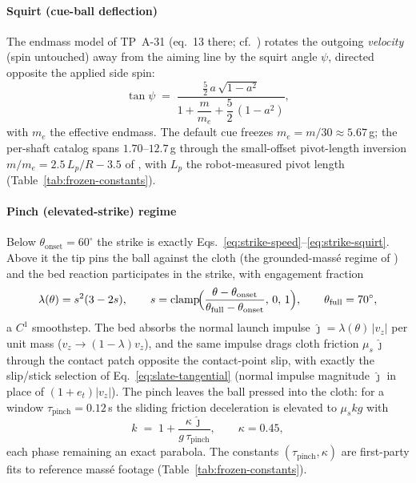 \paragraph{Squirt (cue-ball deflection)} The endmass model of TP~A-31
(eq.~13 there; cf.\ \citealp{shepard2001squirt,cross2008squirt})
rotates the outgoing \emph{velocity} (spin untouched) away from the
aiming line by the squirt angle $\psi$, directed opposite the applied
side spin:
\begin{equation}
\tan\psi \;=\; \frac{\tfrac{5}{2}\,a\,\sqrt{1-a^{2}}}
{1 + \dfrac{m}{m_e} + \dfrac{5}{2}\,(1-a^{2})},
\label{eq:strike-squirt}
\end{equation}
with $m_e$ the effective endmass. The default cue freezes
$m_e = m/30 \approx 5.67$\,g; the per-shaft catalog spans
$1.70$--$12.7$\,g through the small-offset pivot-length inversion
$m/m_e = 2.5\,L_p/R - 3.5$ of \citet{shepard2001squirt}, with
$L_p$ the robot-measured pivot length
(Table~\ref{tab:frozen-constants}).

\paragraph{Pinch (elevated-strike) regime} Below
$\theta_{\mathrm{onset}} = 60^{\circ}$ the strike is exactly
Eqs.~\eqref{eq:strike-speed}--\eqref{eq:strike-squirt}. Above it the
tip pins the ball against the cloth (the grounded-mass\'e regime of
\citealp{coriolis1835}) and the bed reaction participates in the
strike, with engagement fraction
\begin{equation}
\lambda(\theta) = s^{2}(3 - 2s), \qquad
s = \operatorname{clamp}\!\Bigl(
\frac{\theta - \theta_{\mathrm{onset}}}
{\theta_{\mathrm{full}} - \theta_{\mathrm{onset}}},\, 0,\, 1\Bigr),
\qquad \theta_{\mathrm{full}} = 70^{\circ},
\label{eq:strike-pinch}
\end{equation}
a $C^{1}$ smoothstep. The bed absorbs the normal launch impulse
$\hat{\jmath} = \lambda(\theta)\,|v_z|$ per unit mass
($v_z \to (1-\lambda)v_z$), and the same impulse drags cloth friction
$\mu_s\,\hat{\jmath}$ through the contact patch opposite the
contact-point slip, with exactly the slip/stick selection of
Eq.~\eqref{eq:slate-tangential} (normal impulse magnitude
$\hat{\jmath}$ in place of $(1+e_t)|v_z|$). The pinch
leaves the ball pressed into the cloth: for a window
$\tau_{\mathrm{pinch}} = 0.12$\,s the sliding friction deceleration is
elevated to $\mu_s k g$ with
\begin{equation}
k \;=\; 1 + \frac{\kappa\,\hat{\jmath}}{g\,\tau_{\mathrm{pinch}}},
\qquad \kappa = 0.45,
\label{eq:strike-press}
\end{equation}
each phase remaining an exact parabola. The constants
$(\tau_{\mathrm{pinch}}, \kappa)$ are first-party fits to reference
mass\'e footage (Table~\ref{tab:frozen-constants}).

